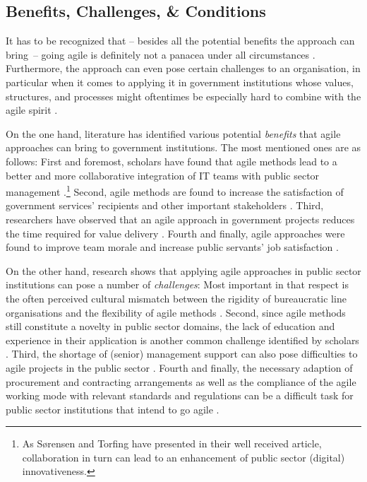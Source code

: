 \subsection{Benefits, Challenges, \& Conditions}\label{Benefits, Challenges, and Conditions}
It has to be recognized that – besides all the potential benefits the approach can bring~– going agile is definitely not a panacea under all circumstances \parencite{Rigby2016}. Furthermore, the approach can even pose certain challenges to an organisation, in particular when it comes to applying it in government institutions whose values, structures, and processes might oftentimes be especially hard to combine with the agile spirit \parencite{Hajjdiab2011}.

On the one hand, literature has identified various potential \textit{benefits} that agile approaches can bring to government institutions. The most mentioned ones are as follows: First and foremost, scholars have found that agile methods lead to a better and more collaborative integration of IT teams with public sector management \parencite{Upender2005,berger2005uk, Berger2007,Dubinsky2005}.\footnote{As Sørensen and Torfing \parencite*{Sorensen2011} have presented in their well received article, collaboration in turn can lead to an enhancement of public sector (digital) innovativeness.} Second, agile methods are found to increase the satisfaction of government services' recipients and other important stakeholders \parencite{Fruhling2008,  Fulgham2011, iliev2009case}. Third, researchers have observed that an agile approach in government projects reduces the time required for value delivery \parencite{Upender2005, Surdu2006, McMahon2006, Moore2001}. Fourth and finally, agile approaches were found to improve team morale and increase public servants' job satisfaction \parencite{Hajjdiab2011, Vacari2015, Dubinsky2005}. 

On the other hand, research shows that applying agile approaches in public sector institutions can pose a number of \textit{challenges}: Most important in that respect is the often perceived cultural mismatch between the rigidity of bureaucratic line organisations and the flexibility of agile methods \parencite{Mergel, Fruhling2008, Altukhova2016, berger2005uk, Greve2019}. Second, since agile methods still constitute a novelty in public sector domains, the lack of education and experience in their application is another common challenge identified by scholars \parencite{Nuottila2016, McMahon2006, Fridman2016}. Third, the shortage of (senior) management support can also pose difficulties to agile projects in the public sector \parencite{Mergel,Berger2007,Dubinsky2005, Hajjdiab2011}. Fourth and finally, the necessary adaption of procurement and contracting arrangements as well as the compliance of the agile working mode with relevant standards and regulations can be a difficult task for public sector institutions that intend to go agile \parencite{Nuottila2016,Mergel, Fruhling2008, Fulgham2011}.

